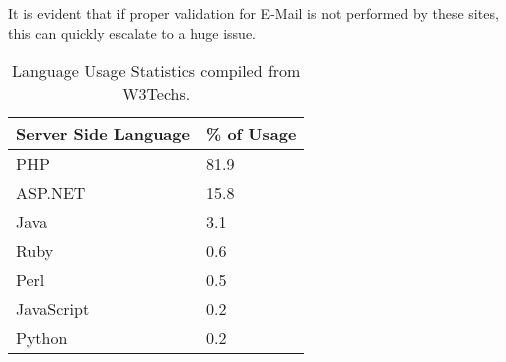 It is evident that if proper validation for E-Mail is not performed by these sites, this can quickly escalate to a huge issue.

\begin{table}[!htbp]
	\centering
	\begin{tabular}{|p{4cm}|p{4cm}|}
		\hline
		\multicolumn{1}{|c|}{\textbf{Server Side Language}} & \multicolumn{1}{c|}{\textbf{\% of Usage}}\\
		\hline
		PHP & 81.9\\
		\hline    
		ASP.NET & 15.8\\
		\hline
		Java & 3.1\\
		\hline
		Ruby & 0.6\\
		\hline
		Perl & 0.5\\
		\hline
		JavaScript & 0.2\\
		\hline
		Python & 0.2\\
		\hline
		
	\end{tabular}
	\caption{Language Usage Statistics compiled from W3Techs.}
	\label{tab:usage}
\end{table}